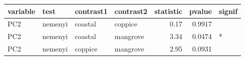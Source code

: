 
\begin{tabular}{llllrrl}
\toprule
variable & test & contrast1 & contrast2 & statistic & pvalue & signif\\
\midrule
PC2 & nemenyi & coastal & coppice & 0.17 & 0.9917 & \\
PC2 & nemenyi & coastal & mangrove & 3.34 & 0.0474 & *\\
PC2 & nemenyi & coppice & mangrove & 2.95 & 0.0931 & \\
\bottomrule
\end{tabular}
